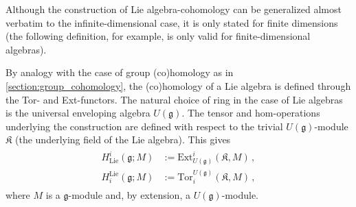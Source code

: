     Although the construction of Lie algebra-cohomology can be generalized almost verbatim to the infinite-dimensional case, it is only stated for finite dimensions (the following definition, for example, is only valid for finite-dimensional algebras).

    By analogy with the case of group (co)homology as in \cref{section:group_cohomology}, the (co)homology of a Lie algebra is defined through the Tor- and Ext-functors. The natural choice of ring in the case of Lie algebras is the universal enveloping algebra $U(\mathfrak{g})$. The tensor and hom-operations underlying the construction are defined with respect to the trivial $U(\mathfrak{g})$-module $\mathfrak{K}$ (the underlying field of the Lie algebra). This gives
    \begin{gather}
        \begin{aligned}
            H^i_{\text{Lie}}(\mathfrak{g};M) &:= \mathrm{Ext}^i_{U(\mathfrak{g})}(\mathfrak{K},M)\,,\\
            H_i^{\text{Lie}}(\mathfrak{g};M) &:= \mathrm{Tor}_i^{U(\mathfrak{g})}(\mathfrak{K},M)\,,
        \end{aligned}
    \end{gather}
    where $M$ is a $\mathfrak{g}$-module and, by extension, a $U(\mathfrak{g})$-module.

